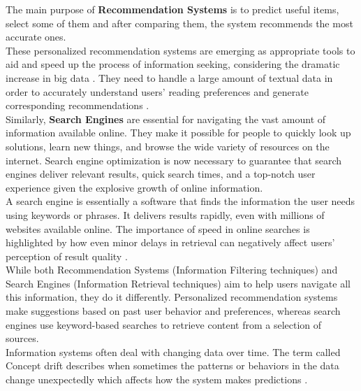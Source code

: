 \documentclass[\myFontSize,a4paper,oneside,hidelinks]{article}
\begin{document}
The main purpose of \textbf{Recommendation Systems} is to predict useful items, select some of them and after comparing them, the system recommends the most accurate ones.\\ 
These personalized recommendation systems are emerging as appropriate tools to aid and speed up the process of information seeking, considering the dramatic increase in big data \cite{Haruna2017}. They need to handle a large amount of textual data in order to accurately understand users’ reading preferences and generate corresponding recommendations \cite{Yan2024}. \\
%
%
Similarly, \textbf{Search Engines} are essential for navigating the vast amount of information available online. They make it possible for people to quickly look up solutions, learn new things, and browse the wide variety of resources on the internet. Search engine optimization is now necessary to guarantee that search engines deliver relevant results, quick search times, and a top-notch user experience given the explosive growth of online information.\\
A search engine is essentially a software that finds the information the user needs using keywords or phrases. It delivers results rapidly, even with millions of websites available online.
The importance of speed in online searches is highlighted by how even minor delays in retrieval can negatively affect users' perception of result quality \cite{pub.1171882357}.\\
%
While both Recommendation Systems (Information Filtering techniques) and Search Engines (Information Retrieval techniques) aim to help users navigate all this information, they do it differently. Personalized recommendation systems make suggestions based on past user behavior and preferences, whereas search engines use keyword-based searches to retrieve content from a selection of sources.\\
%
Information systems often deal with changing data over time. The term called Concept drift describes when sometimes the patterns or behaviors in the data change unexpectedly which affects how the system makes predictions \cite{Sun2024}.\\
\end{document}
